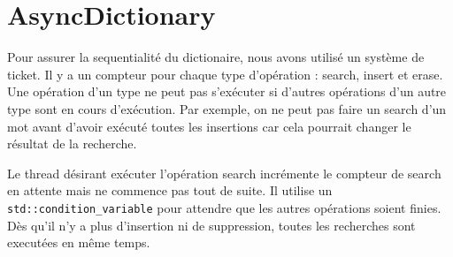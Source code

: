 \documentclass{article}
\begin{document}
\section{AsyncDictionary}
Pour assurer la sequentialité du dictionaire, nous avons utilisé un
système de ticket.
Il y a un compteur pour chaque type d'opération : search, insert et
erase.
Une opération d'un type ne peut pas s'exécuter si d'autres opérations d'un
autre type sont en cours d'exécution. Par exemple, on ne peut pas faire un search
d'un mot avant d'avoir exécuté toutes les insertions car cela pourrait changer le
résultat de la recherche.

Le thread désirant exécuter l'opération search incrémente le compteur de
search en attente mais ne commence pas tout de suite.
Il utilise un \texttt{std::condition\_variable} pour attendre que les
autres opérations soient finies.  Dès qu'il n'y a plus d'insertion ni de
suppression, toutes les recherches sont executées en même temps.
\end{document}
